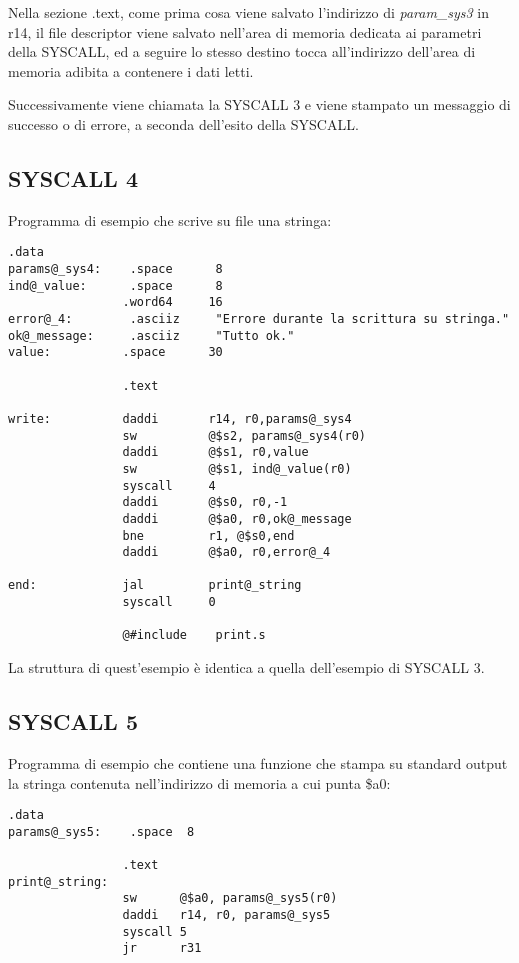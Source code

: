\documentclass[letterpaper,10pt,italian]{sphinxmanual}
\begin{document}
Nella sezione .text, come prima cosa viene salvato l'indirizzo di \emph{param\_sys3}
in r14, il file descriptor viene salvato nell'area di memoria dedicata ai
parametri della SYSCALL, ed a seguire lo stesso destino tocca all'indirizzo
dell'area di memoria adibita a contenere i dati letti.

Successivamente viene chiamata la SYSCALL 3 e viene stampato un messaggio di
successo o di errore, a seconda dell'esito della SYSCALL.


\subsection{SYSCALL 4}
\label{examples:syscall-4}
Programma di esempio che scrive su file una stringa:

\begin{Verbatim}[commandchars=@\[\]]
                .data
params@_sys4:    .space      8
ind@_value:      .space      8
                .word64     16
error@_4:        .asciiz     "Errore durante la scrittura su stringa."
ok@_message:     .asciiz     "Tutto ok."
value:          .space      30

                .text

write:          daddi       r14, r0,params@_sys4
                sw          @$s2, params@_sys4(r0)
                daddi       @$s1, r0,value
                sw          @$s1, ind@_value(r0)
                syscall     4
                daddi       @$s0, r0,-1
                daddi       @$a0, r0,ok@_message
                bne         r1, @$s0,end
                daddi       @$a0, r0,error@_4

end:            jal         print@_string
                syscall     0

                @#include    print.s
\end{Verbatim}

La struttura di quest'esempio è identica a quella dell'esempio di SYSCALL 3.


\subsection{SYSCALL 5}
\label{examples:syscall-5}
Programma di esempio che contiene una funzione che stampa su standard output la
stringa contenuta nell'indirizzo di memoria a cui punta \$a0:

\begin{Verbatim}[commandchars=@\[\]]
                .data
params@_sys5:    .space  8

                .text
print@_string:
                sw      @$a0, params@_sys5(r0)
                daddi   r14, r0, params@_sys5
                syscall 5
                jr      r31
\end{Verbatim}
\end{document}
